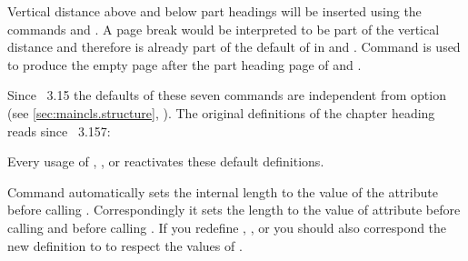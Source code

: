 Vertical distance above and below part headings will be inserted using the
commands  and . A page break
would be interpreted to be part of the vertical distance and therefore is
already part of the default of  in
 and
. Command
 is used to produce the empty page after the part heading
page of  and .

Since \KOMAScript~3.15 the defaults of these seven commands
are independent from option  (see
\autoref{sec:maincls.structure},
). The original definitions of the
chapter heading reads since
\KOMAScript~3.157:
\begin{lstcode}
  \newcommand*{\chapterheadstartvskip}{\vspace{\@tempskipa}}
  \newcommand*{\chapterheadmidvskip}{\par\nobreak\vskip\@tempskipa}
  \newcommand*{\chapterheadendvskip}{\vskip\@tempskipa}
\end{lstcode}
Every usage of ,
, or
 reactivates these default
definitions.

Command  automatically sets the internal length
 to the value of the
 attribute
 before calling
. Correspondingly it sets the length to the value
of attribute  before calling  and
 before calling . If you redefine
, , or
 you should also correspond the new definition to
 to respect the values of .

